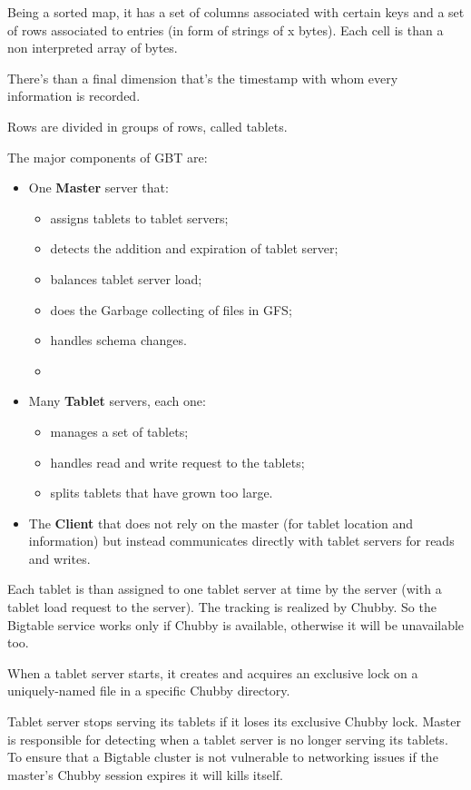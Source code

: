 Being a sorted map, it has a set of columns associated with certain keys and a set of rows associated to entries (in form of strings of x bytes). Each cell is than a non interpreted array of bytes.

There's than a final dimension that's the timestamp with whom every information is recorded.

Rows are divided in groups of rows, called tablets.

The major components of GBT are:
\begin{itemize}
    \item One \textbf{Master} server that:
    \begin{itemize}
        \item assigns tablets to tablet servers;
        \item detects the addition and expiration of tablet server;
        \item balances tablet server load;
        \item does the Garbage collecting of files in GFS;
        \item handles schema changes.
        \item 
    \end{itemize}
    \item Many \textbf{Tablet} servers, each one:
    \begin{itemize}
        \item manages a set of tablets;
        \item handles read and write request to the tablets;
        \item splits tablets that have grown too large.
    \end{itemize}
    \item The \textbf{Client} that does not rely on the master (for tablet location and information) but instead communicates directly with tablet servers for reads and writes.
\end{itemize}

Each tablet is than assigned to one tablet server at time by the server (with a tablet load request to the server).
The tracking is realized by Chubby. So the Bigtable service works only if Chubby is available, otherwise it will be unavailable too.

When a tablet server starts, it creates and acquires an exclusive lock on a uniquely-named file in a specific Chubby directory.

Tablet server stops serving its tablets if it loses its exclusive Chubby lock. Master is responsible for detecting when a tablet server is no longer serving its tablets. To ensure that a Bigtable cluster is not vulnerable to networking issues if the master's Chubby session expires it will kills itself.

